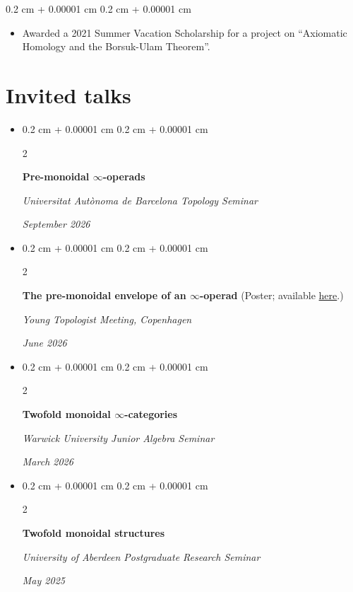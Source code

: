 \documentclass[10pt, letterpaper]{article}
\newenvironment{highlights}{
    \begin{itemize}[
        topsep=0.10 cm,
        parsep=0.10 cm,
        partopsep=0pt,
        itemsep=0pt,
        leftmargin=0.4 cm + 10pt
    ]
}{
    \end{itemize}
} %
\newenvironment{onecolentry}{
    \begin{adjustwidth}{
        0.2 cm + 0.00001 cm
    }{
        0.2 cm + 0.00001 cm
    }
}{
    \end{adjustwidth}
} %
\newenvironment{twocolentry}[2][]{
    \onecolentry
    \def\secondColumn{#2}
    \setcolumnwidth{\fill, 4.5 cm}
    \begin{paracol}{2}
}{
    \switchcolumn \raggedleft \secondColumn
    \end{paracol}
    \endonecolentry
} %
\let\hrefWithoutArrow\href
\renewcommand{\href}[2]{\hrefWithoutArrow{#1}{\ifthenelse{\equal{#2}{}}{ }{#2 }\raisebox{.15ex}{\footnotesize \faExternalLink*}}}
\begin{document}
        \vspace{0.10 cm}
        \begin{onecolentry}
            \begin{highlights}
                \item Awarded a 2021 Summer Vacation Scholarship for a project on “Axiomatic Homology and the Borsuk-Ulam Theorem”.
            \end{highlights}
        \end{onecolentry}

    \section{Invited talks}
    \begin{highlights}
    \item \begin{twocolentry}{
        \textit{September 2026}}
            \textbf{Pre-monoidal $\infty$-operads }

            \textit{Universitat Autònoma de Barcelona Topology Seminar}
        \end{twocolentry}
\item \begin{twocolentry}{
        \textit{June 2026}}
            \textbf{The pre-monoidal envelope of an $\infty$-operad} (Poster; available \hrefWithoutArrow{https://malthefogsporring.github.io/files/copenhagen_poster.pdf}{here}.)

            \textit{Young Topologist Meeting, Copenhagen}
        \end{twocolentry}
    \item \begin{twocolentry}{
           
            
        \textit{March 2026}}
            \textbf{Twofold monoidal $\infty$-categories }

            \textit{Warwick University Junior Algebra Seminar}
        \end{twocolentry}
    \item \begin{twocolentry}{
           
            
        \textit{May 2025}}
            \textbf{Twofold monoidal structures}

            \textit{University of Aberdeen Postgraduate Research Seminar}
        \end{twocolentry}
\end{highlights}
\end{document}
